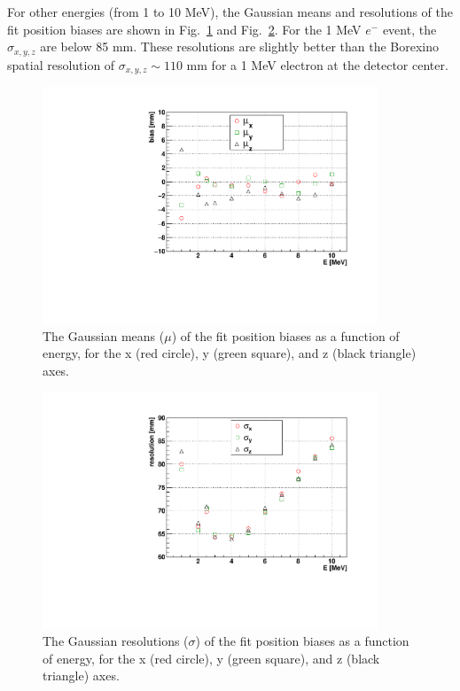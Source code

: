 For other energies (from 1 to 10 MeV), the Gaussian means and resolutions of the fit position biases are shown in Fig.~\ref{fig:scintBiasVsE} and Fig.~\ref{fig:scintResolVsE}. For the 1 MeV $e^-$ event, the $\sigma_{x,y,z}$ are below 85 mm. These resolutions are slightly better than the Borexino spatial resolution of $\sigma_{x,y,z} \sim 110$ mm for a 1 MeV electron at the detector center\cite{borexino2020experimental}.

\begin{figure}[!htb]
	\centering
	\includegraphics[width=10cm]{fullScintBiasVsE.pdf}
	\caption[The Gaussian means ($\mu$) of the \texttt{MP scint fitter} fit position biases as a function of energy, for the x, y, and z axes.]{The Gaussian means ($\mu$) of the fit position biases as a function of energy, for the x (red circle), y (green square), and z (black triangle) axes.}
	\label{fig:scintBiasVsE}
\end{figure}

\begin{figure}[!htb]
	\centering
	\includegraphics[width=10cm]{fullScintResolVsE.pdf}
	\caption[The Gaussian resolutions ($\sigma$) of the \texttt{MP scint fitter} fit position biases as a function of energy, for the x, y, and z axes.]{The Gaussian resolutions ($\sigma$) of the fit position biases as a function of energy, for the x (red circle), y (green square), and z (black triangle) axes.}
	\label{fig:scintResolVsE}
\end{figure}

